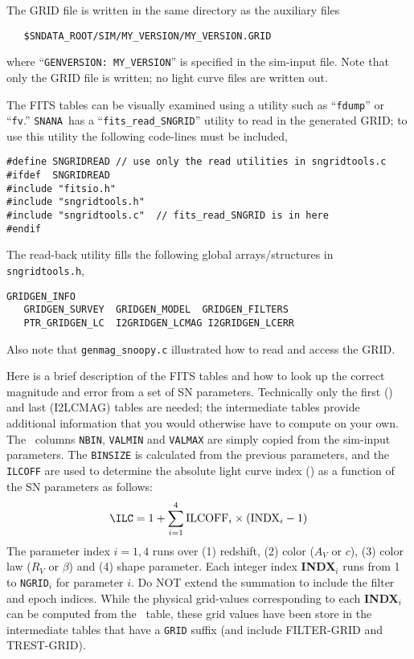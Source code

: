 \documentclass[12pt]{article}
\newcommand{\snana}{{\tt SNANA}}
\begin{document}
The GRID file is written in the same directory as the 
auxiliary files
\begin{verbatim}
   $SNDATA_ROOT/SIM/MY_VERSION/MY_VERSION.GRID
\end{verbatim}
%
where ``{\tt GENVERSION: MY\_VERSION}'' is specified in 
the sim-input file. Note that only the GRID file is written;
no light curve files are written out.


The FITS tables can be visually examined using a utility such
as ``{\tt fdump}'' or ``{\tt fv}.''
\snana\ has a ``{\tt fits\_read\_SNGRID}'' utility to read
in the generated GRID; to use this utility the following 
code-lines must be included,
%
\begin{Verbatim}[frame=single]
#define SNGRIDREAD // use only the read utilities in sngridtools.c
#ifdef  SNGRIDREAD
#include "fitsio.h"
#include "sngridtools.h" 
#include "sngridtools.c"  // fits_read_SNGRID is in here
#endif
\end{Verbatim}
%
The read-back utility fills the following global arrays/structures
in {\tt sngridtools.h},
\begin{Verbatim}[frame=single]
   GRIDGEN_INFO
   GRIDGEN_SURVEY  GRIDGEN_MODEL  GRIDGEN_FILTERS
   PTR_GRIDGEN_LC  I2GRIDGEN_LCMAG I2GRIDGEN_LCERR
\end{Verbatim}
%
Also note that {\tt genmag\_snoopy.c} illustrated how
to read and access the GRID.

\bigskip

Here is a brief description of the FITS tables and how to look up
the correct magnitude and error from a set of SN parameters.
Technically only the first ({\SNPARINFO}) and last (I2LCMAG) tables 
are needed; the intermediate tables provide additional information
that you would otherwise have to compute on your own.
The \SNPARINFO\ columns {\tt NBIN}, {\tt VALMIN} and {\tt VALMAX} 
are simply copied from the sim-input parameters. 
The {\tt BINSIZE} is calculated from the previous parameters, 
and the {\tt ILCOFF} are used to determine the absolute
light curve index ({\ILC}) as a function of the 
SN parameters as follows:
%
\begin{equation}
   {\rm \ILC} = 1 + \sum_{i=1}^4 {\rm ILCOFF}_i \times ({\rm INDX}_i - 1)
   \label{eq:ilcoff}
\end{equation}
%
The parameter index $i=1,4$ runs over 
(1) redshift, 
(2) color ($A_V$ or $c$), 
(3) color law ($R_V$ or $\beta$) and
(4) shape parameter.
Each integer index {\bf INDX}$_i$ runs from 1 to {\tt NGRID}$_i$ 
for parameter $i$.
Do NOT extend the summation to include the filter and epoch indices.
While the physical grid-values corresponding to each {\bf INDX}$_i$ 
can be computed from the \SNPARINFO\ table,
these grid values have been store in the intermediate tables that 
have a {\tt GRID} suffix
(and include FILTER-GRID and TREST-GRID).
\end{document}
